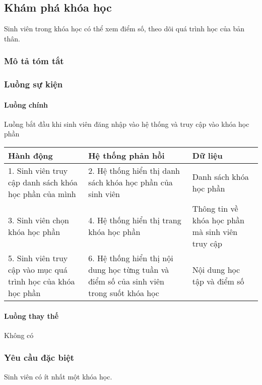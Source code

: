 \documentclass[./../main_file.tex]{subfiles}
\begin{document}
\subsection{Khám phá khóa học}
Sinh viên trong khóa học có thể xem điểm số, theo dõi quá trình học của bản thân.

\subsubsection{Mô tả tóm tắt}
\subsubsection{Luồng sự kiện}
\paragraph{Luồng chính}
 Luồng bắt đầu khi sinh viên đăng nhập vào hệ thống và truy cập vào khóa học phần
\begin{table}[H]
				\begin{tabular}{|p{.33\textwidth}|p{}|p{}|}
		\hline
		\textbf{Hành động}                                 & \textbf{Hệ thống phản hồi}                             & \textbf{Dữ liệu}                                \\ \hline
		1. Sinh viên truy cập danh sách khóa học phần của mình & 2. Hệ thống hiển thị danh sách khóa học phần của sinh viên & Danh sách khóa học phần                          \\ \hline
		3. Sinh viên chọn khóa học phần                        & 4. Hệ thống hiển thị trang khóa học phần                & Thông tin về khóa học phần mà sinh viên truy cập \\ \hline
		5. Sinh viên truy cập vào mục quá trình học của khóa học phần &
		6. Hệ thống hiển thị nội dung học từng tuần và điểm số của sinh viên trong suốt khóa học &
		Nội dung học tập và điểm số \\ \hline
	\end{tabular}
\end{table}
\paragraph{Luồng thay thế}
Không có

\subsubsection{Yêu cầu đặc biệt}
Sinh viên có ít nhất một khóa học.
\end{document}
